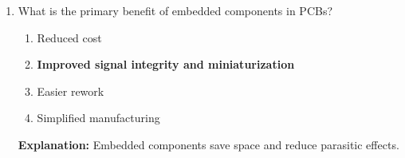 \documentclass{article}
\begin{document}
\begin{enumerate}[resume]
		\item What is the primary benefit of embedded components in PCBs?
		\begin{enumerate}
			\item Reduced cost
			\item \textbf{Improved signal integrity and miniaturization}
			\item Easier rework
			\item Simplified manufacturing
		\end{enumerate}
		\textbf{Explanation:} Embedded components save space and reduce parasitic effects.
	\end{enumerate}
	
\end{document}
